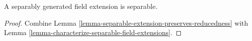\begin{lemma}
\label{lemma-separably-generated-separable}
A separably generated field extension is separable.
\end{lemma}

\begin{proof}
Combine Lemma \ref{lemma-separable-extension-preserves-reducedness}
with Lemma \ref{lemma-characterize-separable-field-extensions}.
\end{proof}